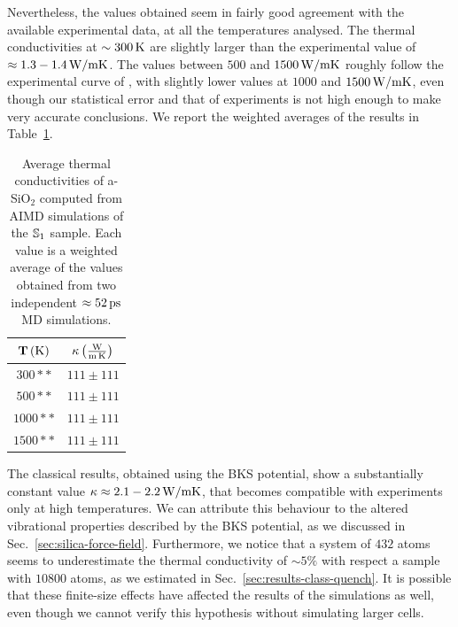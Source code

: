 Nevertheless, the values obtained seem in fairly good agreement with the available experimental data, at all the temperatures analysed. 
The thermal conductivities at $\sim 300\,\mathrm{K}$ are slightly larger than the experimental value of $\approx 1.3-1.4\,\mathrm{W/mK}$. 
The values between $500$ and $1500\,\mathrm{W/mK}$ roughly follow the experimental curve of \citet{Cahill1990}, with slightly lower values at $1000$ and $1500\,\mathrm{W/mK}$, even though our statistical error and that of experiments is not high enough to make very accurate conclusions. 
We report the weighted averages of the \abinitio results in Table~\ref{tab:results-quantum-wkappa}.

\begin{table}[!tb]
    \centering
    \begin{tabular}{c|c}
        $\mathbf{T}\,\mathrm{(K)}$ & $\mathbf{\kappa}\,\mathrm{\left(\frac{W}{m\,K}\right)}$ \\
        \hline
        $300**$ & $111 \pm 111$ \\
        $500**$ & $111 \pm 111$ \\
        $1000**$ & $111 \pm 111$ \\
        $1500**$ & $111 \pm 111$ \\
    \end{tabular}
    \caption{Average thermal conductivities of a-SiO$_2$ computed from AIMD simulations of the $\S1$ sample. Each value is a weighted average of the values obtained from two independent $\approx 52\,\mathrm{ps}$ MD simulations.}
    \label{tab:results-quantum-wkappa}
\end{table}

The classical results, obtained using the BKS potential, show a substantially constant value $\kappa\approx 2.1-2.2\,\mathrm{W/mK}$, that becomes compatible with experiments only at high temperatures. 
We can attribute this behaviour to the altered vibrational properties described by the BKS potential, as we discussed in Sec.~\ref{sec:silica-force-field}. 
Furthermore, we notice that a system of $432$ atoms seems to underestimate the thermal conductivity of $\sim 5\%$ with respect a sample with $10800$ atoms, as we estimated in Sec.~\ref{sec:results-class-quench}. 
It is possible that these finite-size effects have affected the results of the \abinitio simulations as well, even though we cannot verify this hypothesis without simulating larger cells. 

\smallskip
{}








